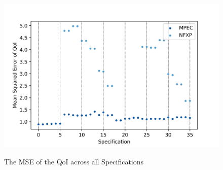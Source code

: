 \begin{figure}[!t]
	\caption{The MSE of the QoI across all Specifications}
	\vspace*{-4mm}
	\centering
	\includegraphics[scale=0.9]{../figures/figure_10.png}
	\label{figure10}
\end{figure}


